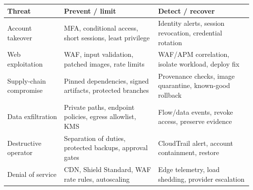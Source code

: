 \begin{tabularx}{\textwidth}{@{}L{32mm}Y Y@{}}
  \toprule
  \color{white}\textbf{Threat} & \color{white}\textbf{Prevent / limit} & \color{white}\textbf{Detect / recover} \\
  \midrule
  Account takeover & MFA, conditional access, short sessions, least privilege & Identity alerts, session revocation, credential rotation \\
  Web exploitation & WAF, input validation, patched images, rate limits & WAF/APM correlation, isolate workload, deploy fix \\
  Supply-chain compromise & Pinned dependencies, signed artifacts, protected branches & Provenance checks, image quarantine, known-good rollback \\
  Data exfiltration & Private paths, endpoint policies, egress allowlist, KMS & Flow/data events, revoke access, preserve evidence \\
  Destructive operator & Separation of duties, protected backups, approval gates & CloudTrail alert, account containment, restore \\
  Denial of service & CDN, Shield Standard, WAF rate rules, autoscaling & Edge telemetry, load shedding, provider escalation \\
  \bottomrule
\end{tabularx}

